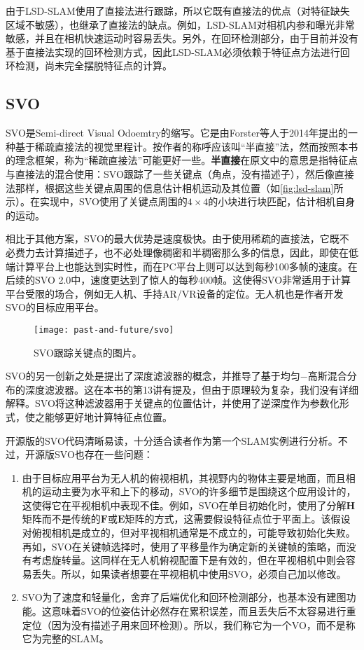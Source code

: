 由于LSD-SLAM使用了直接法进行跟踪，所以它既有直接法的优点（对特征缺失区域不敏感），也继承了直接法的缺点。例如，LSD-SLAM对相机内参和曝光非常敏感，并且在相机快速运动时容易丢失。另外，在回环检测部分，由于目前并没有基于直接法实现的回环检测方式，因此LSD-SLAM必须依赖于特征点方法进行回环检测，尚未完全摆脱特征点的计算。

\subsection{SVO}

SVO是Semi-direct Visual Odoemtry的缩写\textsuperscript{\cite{Forster2014}}。它是由Forster等人于2014年提出的一种基于稀疏直接法的视觉里程计。按作者的称呼应该叫“半直接”法，然而按照本书的理念框架，称为“稀疏直接法”可能更好一些。\textbf{半直接}在原文中的意思是指特征点与直接法的混合使用：SVO跟踪了一些关键点（角点，没有描述子），然后像直接法那样，根据这些关键点周围的信息估计相机运动及其位置（如\autoref{fig:lsd-slam}所示）。在实现中，SVO使用了关键点周围的$4\times4$的小块进行块匹配，估计相机自身的运动。

相比于其他方案，SVO的最大优势是速度极快。由于使用稀疏的直接法，它既不必费力去计算描述子，也不必处理像稠密和半稠密那么多的信息，因此，即使在低端计算平台上也能达到实时性，而在PC平台上则可以达到每秒100多帧的速度。在后续的SVO 2.0中，速度更达到了惊人的每秒400帧。这使得SVO非常适用于计算平台受限的场合，例如无人机、手持AR/VR设备的定位。无人机也是作者开发SVO的目标应用平台。

\begin{figure}[H]
	\centering
	\texttt{[image: past-and-future/svo]}
	\caption{SVO跟踪关键点的图片。}
	\label{fig:svo}
\end{figure}

SVO的另一创新之处是提出了深度滤波器的概念，并推导了基于均匀−高斯混合分布的深度滤波器。这在本书的第13讲有提及，但由于原理较为复杂，我们没有详细解释。SVO将这种滤波器用于关键点的位置估计，并使用了逆深度作为参数化形式，使之能够更好地计算特征点位置。

开源版的SVO代码清晰易读，十分适合读者作为第一个SLAM实例进行分析。不过，开源版SVO也存在一些问题：

\begin{enumerate}
	\item 由于目标应用平台为无人机的俯视相机，其视野内的物体主要是地面，而且相机的运动主要为水平和上下的移动，SVO的许多细节是围绕这个应用设计的，这使得它在平视相机中表现不佳。例如，SVO在单目初始化时，使用了分解$\bm{H}$矩阵而不是传统的$\bm{F}$或$\bm{E}$矩阵的方式，这需要假设特征点位于平面上。该假设对俯视相机是成立的，但对平视相机通常是不成立的，可能导致初始化失败。再如，SVO在关键帧选择时，使用了平移量作为确定新的关键帧的策略，而没有考虑旋转量。这同样在无人机俯视配置下是有效的，但在平视相机中则会容易丢失。所以，如果读者想要在平视相机中使用SVO，必须自己加以修改。
	\item SVO为了速度和轻量化，舍弃了后端优化和回环检测部分，也基本没有建图功能。这意味着SVO的位姿估计必然存在累积误差，而且丢失后不太容易进行重定位（因为没有描述子用来回环检测）。所以，我们称它为一个VO，而不是称它为完整的SLAM。
\end{enumerate}

